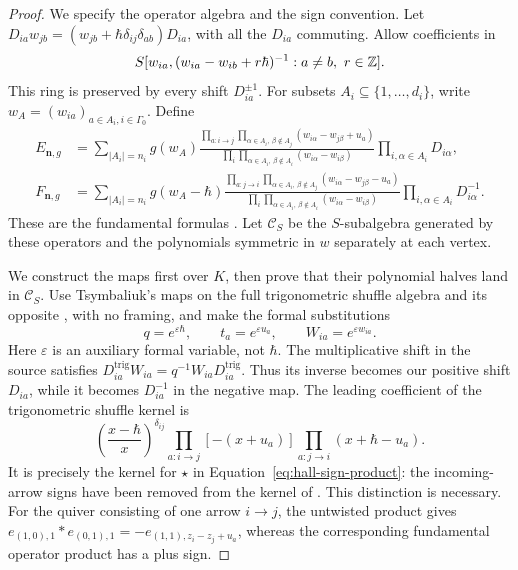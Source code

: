\begin{proof}
We specify the operator algebra and the sign convention.
Let \(D_{ia}w_{jb}=(w_{jb}+\hbar\delta_{ij}\delta_{ab})D_{ia}\),
with all the \(D_{ia}\) commuting.  Allow coefficients in
\[
 S[w_{ia},(w_{ia}-w_{ib}+r\hbar)^{-1}:
                      a\ne b,\ r\in\mathbb Z].
\]
This ring is preserved by every shift \(D_{ia}^{\pm1}\).
For subsets \(A_i\subseteq\{1,\ldots,d_i\}\), write
\(w_A=(w_{ia})_{a\in A_i,i\in\Gamma_0}\).  Define
\begin{align*}
 E_{\mathbf n,g}
 &=\sum_{|A_i|=n_i}
   g(w_A)
   \frac{\displaystyle\prod_{a:i\to j}
             \prod_{\alpha\in A_i,\ \beta\notin A_j}
                (w_{i\alpha}-w_{j\beta}+u_a)}
        {\displaystyle\prod_i
             \prod_{\alpha\in A_i,\ \beta\notin A_i}
                (w_{i\alpha}-w_{i\beta})}
       \prod_{i,\alpha\in A_i}D_{i\alpha},\\
 F_{\mathbf n,g}
 &=\sum_{|A_i|=n_i}
   g(w_A-\hbar)
   \frac{\displaystyle\prod_{a:j\to i}
             \prod_{\alpha\in A_i,\ \beta\notin A_j}
                (w_{i\alpha}-w_{j\beta}-u_a)}
        {\displaystyle\prod_i
             \prod_{\alpha\in A_i,\ \beta\notin A_i}
                (w_{i\alpha}-w_{i\beta})}
       \prod_{i,\alpha\in A_i}D_{i\alpha}^{-1}.
\end{align*}
These are the fundamental formulas
\cite[Equations~(78)--(79)]{JindalNegut26}.
Let \(\mathcal C_S\) be the \(S\)-subalgebra generated by these operators
and the polynomials symmetric in \(w\) separately at each vertex.

We construct the maps first over \(K\), then prove that their polynomial
halves land in \(\mathcal C_S\).
Use Tsymbaliuk's maps on the full trigonometric shuffle algebra and its
opposite \cite[Theorem~5.7, Equations~(93) and~(96)]{Tsymbaliuk23Difference},
with no framing, and make the formal substitutions
\[
 q=e^{\varepsilon\hbar},\qquad
 t_a=e^{\varepsilon u_a},\qquad
 W_{ia}=e^{\varepsilon w_{ia}}.
\]
Here \(\varepsilon\) is an auxiliary formal variable, not \(\hbar\).
The multiplicative shift in the source satisfies
\(D^{\mathrm{trig}}_{ia}W_{ia}=q^{-1}W_{ia}D^{\mathrm{trig}}_{ia}\).
Thus its inverse becomes our positive shift \(D_{ia}\), while it
becomes \(D_{ia}^{-1}\) in the negative map.
The leading coefficient of the trigonometric shuffle kernel is
\[
 \left(\frac{x-\hbar}{x}\right)^{\delta_{ij}}
 \prod_{a:i\to j}[-(x+u_a)]
 \prod_{a:j\to i}(x+\hbar-u_a).
\]
It is precisely the kernel for \(\star\) in
Equation~\eqref{eq:hall-sign-product}: the incoming-arrow signs have
been removed from the kernel of \cite[Equation~(31)]{JindalNegut26}.
This distinction is necessary.  For the quiver consisting of one arrow
\(i\to j\), the untwisted product gives
\(e_{(1,0),1}*e_{(0,1),1}
   =-e_{(1,1),z_i-z_j+u_a}\), whereas the corresponding fundamental
operator product has a plus sign.


\end{proof}
